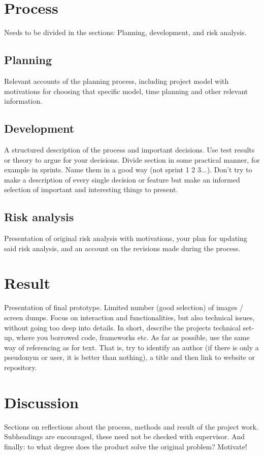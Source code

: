 \documentclass[12pt]{article}
\begin{document}
\section{Process}
Needs to be divided in the sections: Planning, development, and risk analysis.

\subsection{Planning}
Relevant accounts of the planning process, including project model with motivations for choosing that specific model, time planning and other relevant information.
\subsection{Development}
A structured description of the process and important decisions. Use test results or theory to argue for your decisions. Divide section in some practical manner, for example in sprints. Name them in a good way (not sprint 1 2 3...). Don’t try to make a description of every single decision or feature but make an informed selection of important and interesting things to present.

\subsection{Risk analysis}
Presentation of original risk analysis with motivations, your plan for updating said risk analysis, and an account on the revisions made during the process.

\section{Result}
Presentation of final prototype. Limited number (good selection) of images / screen dumps. Focus on interaction and functionalities, but also technical issues, without going too deep into details. In short, describe the projects technical set-up, where you borrowed code, frameworks etc. As far as possible, use the same way of referencing as for text. That is, try to identify an author (if there is only a pseudonym or user, it is better than nothing), a title and then link to website or repository.

\section{Discussion}
Sections on reflections about the process, methods and result of the project work. Subheadings are encouraged, these need not be checked with supervisor. And finally: to what degree does the product solve the original problem? Motivate!
\end{document}
